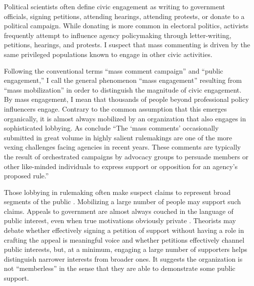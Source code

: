 Political scientists often define civic engagement as writing to government officials, signing petitions, attending hearings, attending protests, or donate to a political campaign. While donating is more common in electoral politics, activists frequently attempt to influence agency policymaking through letter-writing, petitions, hearings, and protests. I suspect that mass commenting is driven by the same privileged populations known to engage in other civic activities. %

Following the conventional terms ``mass comment campaign'' and ``public engagement,'' I call the general phenomenon ``mass engagement'' resulting from ``mass mobilization'' in order to distinguish the magnitude of civic engagement.
By mass engagement, I mean that thousands of people beyond professional policy influencers engage. Contrary to the common assumption that this emerges organically, it is almost always mobilized by an organization that also engages in sophisticated lobbying. %
As \citet{SantAmbrogio2018} conclude ``The `mass comments' occasionally submitted in great volume in highly salient
rulemakings are one of the more vexing challenges facing agencies in recent years. These comments are typically the result of orchestrated campaigns by advocacy groups to persuade members or other like-minded individuals to express support or opposition for an agency's proposed rule.''

Those lobbying in rulemaking often make suspect claims to represent broad segments of the public \citep{Seifter2016UCLA}. Mobilizing a large number of people may support such claims.
Appeals to government are almost always couched in the language of public interest, even when true motivations obviously private \citep{Schattschneider1975}. Theorists may debate whether effectively signing a petition of support without having a role in crafting the appeal is meaningful voice and whether petitions effectively channel public interests, but, at a minimum, engaging a large number of supporters helps distinguish narrower interests from broader ones. It suggests the organization is not ``memberless'' \citep{Skocpol2003} in the sense that they are able to demonstrate some public support.

